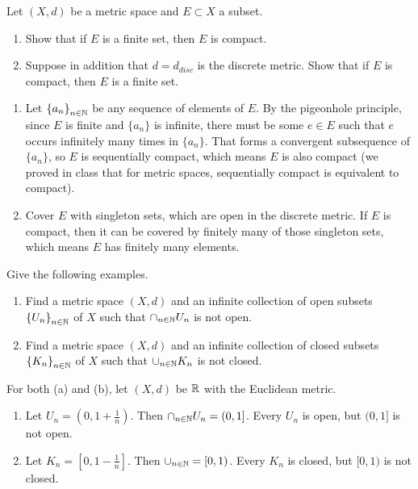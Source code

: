 \documentclass{article}
\begin{document}
\begin{prob}
    Let $(X,d)$ be a metric space and $E \subset X$ a subset.
    \begin{enumerate}[label=(\alph*)]
        \item Show that if $E$ is a finite set, then $E$ is compact.
        \item Suppose in addition that $d=d_{disc}$ is the discrete metric. Show that if $E$ is compact, then $E$ is a finite set.
    \end{enumerate}
\end{prob}
\par
\begin{enumerate}[label=(\alph*)]
    \item Let $ \left\{ a_n \right\}_{n \in \mathbb{N}}$ be any sequence of elements of $E$. By the pigeonhole principle, since $E$ is finite and $ \{a_n\}$ is infinite, there must be some $e \in E$ such that $e$ occurs infinitely many times in $\{a_n\}$. That forms a convergent subsequence of $\{a_n\}$, so $E$ is sequentially compact, which means $E$ is also compact (we proved in class that for metric spaces, sequentially compact is equivalent to compact).
    \item Cover $E$ with singleton sets, which are open in the discrete metric. If $E$ is compact, then it can be covered by finitely many of those singleton sets, which means $E$ has finitely many elements.
\end{enumerate}

\begin{prob}
    Give the following examples.
    \begin{enumerate}[label=(\alph*)]
        \item Find a metric space $(X,d)$ and an infinite collection of open subsets $ \left\{ U_n \right\}_{n \in \mathbb{N}}$ of $X$ such that $\cap_{n \in \mathbb{N}} U_n$ is not open.
        \item Find a metric space $(X, d)$ and an infinite collection of closed subsets $ \left\{ K_n \right\}_{n \in \mathbb{N}}$ of $X$ such that $\cup_{n \in \mathbb{N}} K_n$ is not closed.
    \end{enumerate}
\end{prob}

For both (a) and (b), let $(X, d)$ be $\mathbb{R}$ with the Euclidean metric.
\begin{enumerate}[label=(\alph*)]
    \item Let $U_n = \left( 0, 1 + \frac{1}{n} \right) $. Then $\cap_{n \in \mathbb{N}} U_n = (0, 1]$. Every $U_n$ is open, but $(0, 1]$ is not open.
    \item Let $K_n = \left[ 0, 1 - \frac{1}{n} \right]$. Then $\cup_{n \in \mathbb{N}} = [0, 1)$. Every $K_n$ is closed, but $[0, 1)$ is not closed.
\end{enumerate}


\end{document}
